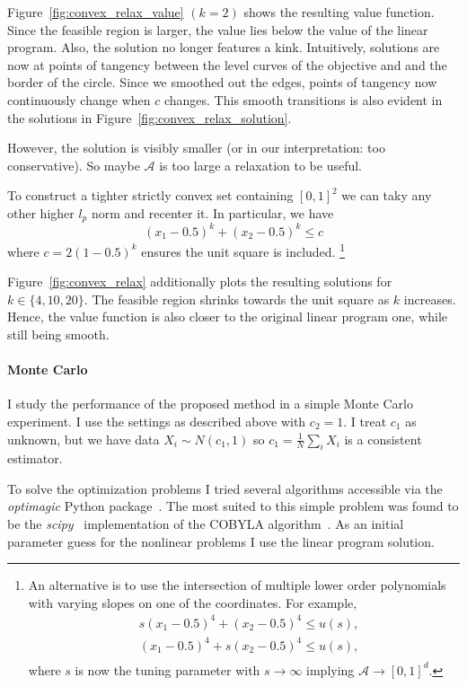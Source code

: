 \documentclass[12pt,a4paper,english]{article} %
\numberwithin{equation}{section}
\theoremstyle{definition}
\theoremstyle{remark}
\theoremstyle{plain}
\begin{document}
Figure~\ref{fig:convex_relax_value} $(k=2)$ shows the resulting value function.
Since the feasible region is larger, the value lies below the value of the linear program.
Also, the solution no longer features a kink.
Intuitively, solutions are now at points of tangency between the level curves of the objective and and the border of the circle.
Since we smoothed out the edges, points of tangency now continuously change when $c$ changes.
This smooth transitions is also evident in the solutions in Figure~\ref{fig:convex_relax_solution}.

However, the solution is visibly smaller (or in our interpretation: too conservative).
So maybe $\mathcal{A}$ is too large a relaxation to be useful.

To construct a tighter strictly convex set containing $[0,1]^2$ we can taky any other higher $l_p$ norm and recenter it.
In particular, we have
\begin{equation*}
	(x_1-0.5)^k + (x_2-0.5)^k \leq c
\end{equation*}
where $c = 2(1-0.5)^k$ ensures the unit square is included.
\footnote{An alternative is to use the intersection of multiple lower order polynomials with varying slopes on one of the coordinates. For example,
\begin{align}
	& s(x_1 - 0.5)^4 + (x_2 - 0.5)^4 \leq u(s), \\
	& (x_1 - 0.5)^4 + s(x_2 - 0.5)^4 \leq u(s), \\
\end{align}
where $s$ is now the tuning parameter with $s\to\infty$ implying $\mathcal{A} \to [0,1]^d$.}

Figure~\ref{fig:convex_relax} additionally plots the resulting solutions for $k\in\{4, 10, 20\}$.
The feasible region shrinks towards the unit square as $k$ increases.
Hence, the value function is also closer to the original linear program one, while still being smooth.

\paragraph{Monte Carlo}
I study the performance of the proposed method in a simple Monte Carlo experiment.
I use the settings as described above with $c_2=1$.
I treat $c_1$ as unknown, but we have data $X_i \sim N(c_1, 1)$ so $\hat{c_1} = \frac{1}{N}\sum_i X_i$ is a consistent estimator.

To solve the optimization problems I tried several algorithms accessible via the \textit{optimagic} Python package~\citep{Gabler2024}.
The most suited to this simple problem was found to be the \textit{scipy}~\citep{scipy} implementation of the COBYLA algorithm~\citep{cobyla_powell1994direct}.
As an initial parameter guess for the nonlinear problems I use the linear program solution.
\end{document}
